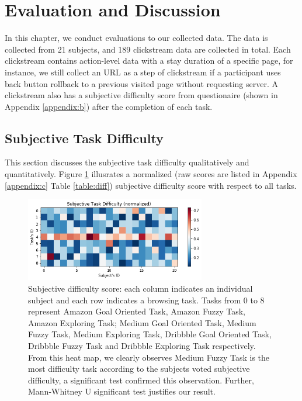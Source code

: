 \section{Evaluation and Discussion}
\label{ch:eval}

In this chapter, we conduct evaluations to our collected data.
The data is collected from 21 subjects, and 189 clickstream data are collected in total. 
Each clickstream contains action-level data with a stay duration
of a specific page, for instance, we still collect an URL as a step of clickstream 
if a participant uses back button rollback to a previous visited page without requesting server. 
A clickstream also has a subjective difficulty score from questionaire (shown in Appendix \ref{appendix:b}) 
after the completion of each task.

\subsection{Subjective Task Difficulty}

This section discusses the subjective task difficulty qualitatively and quantitatively.
Figure \ref{fig:difficulty} illusrates a normalized (raw scores are listed in 
Appendix \ref{appendix:c} Table \ref{table:diff}) subjective difficulty score 
with respect to all tasks.

\begin{figure}[H]
    \centering
    \includegraphics[width=0.7\textwidth]{figures/difficulty}
    \caption{Subjective difficulty score: each column indicates an individual subject and
    each row indicates a browsing task. Tasks from 0 to 8 represent Amazon Goal Oriented Task,
    Amazon Fuzzy Task, Amazon Exploring Task; Medium Goal Oriented Task, Medium Fuzzy Task,
    Medium Exploring Task, Dribbble Goal Oriented Task, Dribbble Fuzzy Task and Dribbble Exploring Task
    respectively.
    From this heat map, we clearly observes Medium Fuzzy Task is the most difficulty task
    according to the subjects voted subjective difficulty, a significant test confirmed this observation.
    Further, Mann-Whitney U significant test justifies our result.}
    \label{fig:difficulty}
\end{figure}

